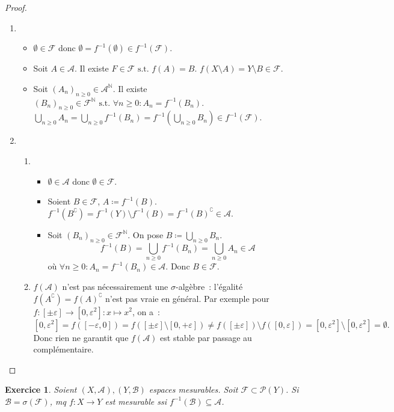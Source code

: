 \documentclass{article}
\newtheorem{ex}{Exercice}[section]
\theoremstyle{definition}
\newcommand{\st}{\text{ s.t. }}
\newcommand{\C}{\complement}
\newcommand{\N}{{\mathbb N}}
\begin{document}
\begin{proof}~
\begin{enumerate}
	\item~
	\begin{itemize}
		\item $\emptyset \in \mathcal F$ donc $\emptyset = f^{-1}(\emptyset) \in f^{-1}(\mathcal F)$.
		\item Soit $A \in \mathcal A$. Il existe $F \in \mathcal F \st f(A) = B$. $f(X \setminus A) = Y \setminus B \in \mathcal F$.  %
		\item Soit $(A_n)_{n \geq 0} \in \mathcal A^\N$. Il existe $(B_n)_{n \geq 0} \in \mathcal F^\N \st \forall n \geq 0 : A_n = f^{-1}(B_n)$.
		$\bigcup_{n \geq 0}A_n = \bigcup_{n \geq 0}f^{-1}(B_n) = f^{-1}\left(\bigcup_{n \geq 0}B_n\right) \in f^{-1}(\mathcal F)$.
	\end{itemize}
	\item~
	\begin{enumerate}
		\item~
		\begin{itemize}
			\item $\emptyset \in \mathcal A$ donc $\emptyset \in \mathcal F$.
			\item Soient $B \in \mathcal F$, $A \coloneqq f^{-1}(B)$. $f^{-1}(B^\C) = f^{-1}(Y) \setminus f^{-1}(B) = f^{-1}(B)^\C \in \mathcal A$.
			\item Soit $(B_n)_{n \geq 0} \in \mathcal F^\N$. On pose $B \coloneqq \bigcup_{n \geq 0}B_n$.
			\[f^{-1}(B) = \bigcup_{n \geq 0}f^{-1}(B_n) = \bigcup_{n \geq 0}A_n \in \mathcal A\]
			où $\forall n \geq 0 : A_n = f^{-1}(B_n) \in \mathcal A$. Donc $B \in \mathcal F$.
		\end{itemize}
		\item $f(\mathcal A)$ n'est pas nécessairement une $\sigma$-algèbre~: l'égalité $f(A^\C) = f(A)^\C$ n'est pas vraie en général. Par exemple pour
		$f : [\pm\varepsilon] \to [0, \varepsilon^2] : x \mapsto x^2$, on a~:
		\[[0, \varepsilon^2] = f([-\varepsilon, 0]) = f([\pm\varepsilon] \setminus [0, +\varepsilon])
		  \neq f([\pm\varepsilon]) \setminus f([0, \varepsilon]) = [0, \varepsilon^2] \setminus [0, \varepsilon^2] = \emptyset.\]
		Donc rien ne garantit que $f(\mathcal A)$ est stable par passage au complémentaire.
	\end{enumerate}
\end{enumerate}
\end{proof}

\begin{ex} Soient $(X, \mathcal A), (Y, \mathcal B)$ espaces mesurables. Soit $\mathcal F \subset \mathcal P(Y)$. Si $\mathcal B = \sigma(\mathcal F)$, mq $f : X \to Y$
est mesurable ssi $f^{-1}(\mathcal B) \subseteq \mathcal A$.
\end{ex}
\end{document}
